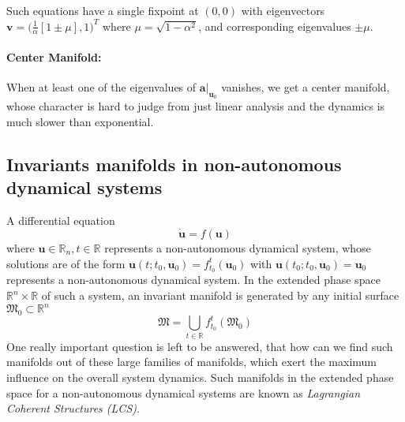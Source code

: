 Such equations have a single fixpoint at $ (0,0) $ with eigenvectors $ \textbf{v} = \Big(\frac{1}{\alpha}[1 \pm \mu], 1 \Big)^{T} $ where $ \mu = \sqrt{1 - \alpha^{2}} $, and corresponding eigenvalues $ \pm \mu $.

\paragraph{Center Manifold:} When at least one of the eigenvalues of $ \textbf{a}\vert_{\textbf{u}_{0}} $ vanishes, we get a center manifold, whose character is hard to judge from just linear analysis and the dynamics is much slower than exponential.

\subsection{Invariants manifolds in non-autonomous dynamical systems}
A differential equation
\begin{equation}
\dot{\textbf{u}} = f(\textbf{u})
\end{equation}
where $ \textbf{u}\in\mathbb{R}_{n}, t \in \mathbb{R}  $ represents a non-autonomous dynamical system, whose solutions are of the form $ \textbf{u}(t;t_{0}, \textbf{u}_{0}) = f_{t_{0}}^{t}(\textbf{u}_{0})$ with $ \textbf{u}(t_{0};t_{0}, \textbf{u}_{0}) = \textbf{u}_{0} $ represents a non-autonomous dynamical system. In the extended phase space $ \mathbb{R}^{n}\times\mathbb{R} $ of such a system, an invariant manifold is generated by any initial surface $ \mathfrak{M}_{0}\subset\mathbb{R}^{n} $
\begin{equation}
\mathfrak{M} = \bigcup_{t\in\mathbb{R}} f_{t_{0}}^{t} (\mathfrak{M}_{0})
\end{equation}
One really important question is left to be answered, that how can we find such manifolds out of these large families of manifolds, which exert the maximum influence on the overall system dynamics. Such manifolds in the extended phase space for a non-autonomous dynamical systems are known as \textit{Lagrangian Coherent Structures (LCS)}.

